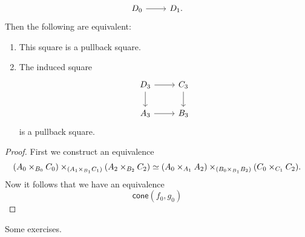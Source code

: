 \begin{thm}
\begin{equation*}
\begin{tikzcd}
      D_0 \arrow[r] & D_1.
    \end{tikzcd}
  \end{equation*}
  Then the following are equivalent:
  \begin{enumerate}
  \item This square is a pullback square.
  \item The induced square
    \begin{equation*}
      \begin{tikzcd}
        D_3 \arrow[r] \arrow[d] & C_3 \arrow[d] \\
        A_3 \arrow[r] & B_3
      \end{tikzcd}
    \end{equation*}
    is a pullback square.
  \end{enumerate}
\end{thm}

\begin{proof}
  First we construct an equivalence
  \begin{equation*}
    (A_0\times_{B_0}C_0)\times_{(A_1\times_{B_1}C_1)}(A_2\times_{B_2} C_2) \simeq (A_0\times_{A_1}A_2)\times_{(B_0\times_{B_1} B_2)} (C_0\times_{C_1}C_2).
  \end{equation*}
  Now it follows that we have an equivalence
  \begin{equation*}
    \mathsf{cone}(f_0,g_0)
  \end{equation*}
\end{proof}


\begin{exercises}
\item Some exercises.
\end{exercises}

